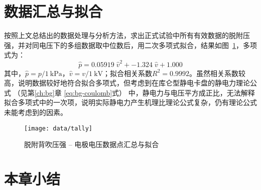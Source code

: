 



\section{数据汇总与拟合}\label{sec:analysis-tally}

按照上文总结出的数据处理与分析方法，求出正式试验中所有有效数据的脱附压强，并对同电压下的多组数据取中位数\footnotemark{}后，用二次多项式拟合，结果如图~\ref{fig:data-tally}，多项式为：
\[
\hat{p} = 0.05919\;\hat{v}^2 + -1.324\;\hat{v} + 1.000
\]
其中，$\hat{p} = p / \SI{1}{\kPa}$，$\hat{v} = v / \SI{1}{\kV}$；拟合相关系数$R^2 = \num{0.9992}$。虽然相关系数较高，说明数据较好地符合拟合多项式，但考虑到在库仑型静电卡盘的静电力理论公式%
（见第\ref{ch:bg}章 \eqref{eq:bg-coulomb}式）%
中，静电力与电压平方成正比，无法解释拟合多项式中的一次项，说明实际静电力产生机理比理论公式复杂，仍有理论公式未能考虑到的因素。


\begin{figure}[thbp]
\centering
\texttt{[image: data/tally]}
\caption{脱附背吹压强 -- 电极电压数据点汇总与拟合}
\label{fig:data-tally}
\end{figure}



\section{本章小结}\label{sec:analysis-summary}


